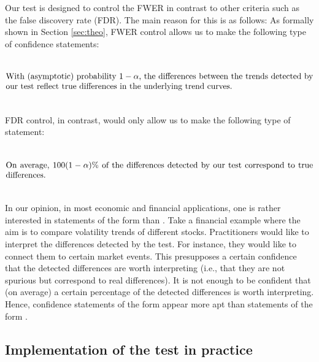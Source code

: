 \documentclass[12pt]{article}
\makeatletter
\renewcommand{\eqref}[1]{\tagform@{\ref{#1}}}
\makeatother
\begin{document}
\begin{remark} 
Our test is designed to control the FWER in contrast to other criteria such as the false discovery rate (FDR). The main reason for this is as follows: As formally shown in Section \ref{sec:theo},  FWER control allows us to make the following type of confidence statements:
\begin{equation}\label{eq:CS-FWER}
\begin{minipage}[c][2.25cm][c]{13cm}
With (asymptotic) probability $1-\alpha$, the differences between the trends detected by our test reflect true differences in the underlying trend curves.
\end{minipage}
\end{equation}
FDR control, in contrast, would only allow us to make the following type of statement:
\begin{equation}\label{eq:CS-FDR}
\begin{minipage}[c][2.25cm][c]{13cm}
On average, $100 (1-\alpha) \%$ of the differences detected by our test correspond to true differences.
\end{minipage}
\end{equation}
In our opinion, in most economic and financial applications, one is rather interested in statements of the form \eqref{eq:CS-FWER} than \eqref{eq:CS-FDR}. Take a financial example where the aim is to compare volatility trends of different stocks. Practitioners would like to interpret the differences detected by the test. For instance, they would like to connect them to certain market events. This presupposes a certain confidence that the detected differences are worth interpreting (i.e., that they are not spurious but correspond to real differences). It is not enough to be confident that (on average) a certain percentage of the detected differences is worth interpreting. Hence, confidence statements of the form \eqref{eq:CS-FWER} appear more apt than statements of the form \eqref{eq:CS-FDR}.
\end{remark}
  

\subsection{Implementation of the test in practice}\label{subsec:test:impl}
\end{document}
